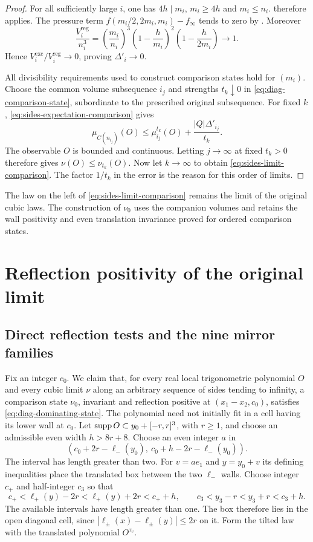 \begin{proof}
For all sufficiently large $i$, one has $4h\mid m_i$, $m_i\ge4h$
and $m_i\le n_i$.  therefore
applies. The pressure term $f(m_i/2,2m_i,m_i)-f_\infty$ tends
to zero by . Moreover
\begin{equation}\label{eq:sides-volume-ratio}
 \frac{V_i^{\mathrm{reg}}}{n_i^3}
 =\left(\frac{m_i}{n_i}\right)^3
    \left(1-\frac h{m_i}\right)^2
    \left(1-\frac h{2m_i}\right)\longrightarrow1.
\end{equation}
Hence $V_i^{\mathrm{exc}}/V_i^{\mathrm{reg}}\to0$, proving
$\Delta'_i\to0$.

All divisibility requirements used to construct comparison states
hold for $(m_i)$. Choose the common volume subsequence $i_j$ and
strengths $t_k\downarrow0$ in \eqref{eq:diag-comparison-state},
subordinate to the prescribed original subsequence. For fixed $k$,
\eqref{eq:sides-expectation-comparison} gives
\[
 \mu_{C(n_{i_j})}(O)\le\mu_{i_j}^{t_k}(O)
                         +\frac{|Q|\Delta'_{i_j}}{t_k}.
\]
The observable $O$ is bounded and continuous. Letting $j\to\infty$
at fixed $t_k>0$ therefore gives $\nu(O)\le\nu_{t_k}(O)$.
Now let $k\to\infty$ to obtain \eqref{eq:sides-limit-comparison}.
The factor $1/t_k$ in the error is the reason for this order of limits.
\end{proof}

The law on the left of \eqref{eq:sides-limit-comparison} remains the
limit of the original cubic laws. The construction of $\nu_0$ uses
the companion volumes and retains the wall positivity and even
translation invariance proved for ordered comparison states.
\section{Reflection positivity of the original limit}\label{sec:completion}

\subsection{Direct reflection tests and the nine mirror families}\label{subsec:diag-separation}

Fix an integer $c_0$. We claim that, for every real local
trigonometric polynomial $O$ and every cubic limit $\nu$ along an
arbitrary sequence of sides tending to infinity, a comparison state
$\nu_0$, invariant and reflection positive at $(x_1-x_2,c_0)$,
satisfies \eqref{eq:diag-dominating-state}. The polynomial need not
initially fit in a cell having its lower wall at $c_0$.
Let $\operatorname{supp} O\subset y_0+[-r,r]^3$, with $r\ge1$, and choose
an admissible even width $h>8r+8$. Choose an even integer
$a$ in
\[
 (c_0+2r-\ell_-(y_0),\ c_0+h-2r-\ell_-(y_0)).
\]
The interval has length greater than two. For $v=ae_1$ and
$y=y_0+v$ its defining inequalities place the translated
box between the two $\ell_-$ walls. Choose integer $c_+$
and half-integer $c_3$ so that
\[
 c_+<\ell_+(y)-2r<\ell_+(y)+2r<c_++h,
 \qquad c_3<y_3-r<y_3+r<c_3+h.
\]
The available intervals have length greater than one.
The box therefore lies in the open diagonal cell, since
$|\ell_\pm(x)-\ell_\pm(y)|\le2r$ on it. Form the tilted
law with the translated polynomial $O^{\tau_v}$.

